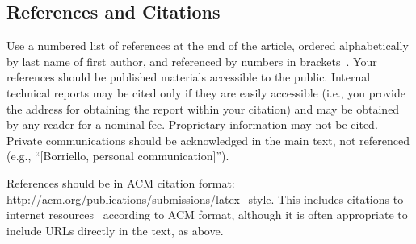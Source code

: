 \documentclass{sigchi}
\begin{document}
\subsection{References and Citations}

Use a numbered list of references at the end of the article, ordered
alphabetically by last name of first author, and referenced by numbers
in
brackets~\cite{acm_categories,ethics,Klemmer:2002:WSC:503376.503378}.
Your references should be published materials accessible to the
public. Internal technical reports may be cited only if they are
easily accessible (i.e., you provide the address for obtaining the
report within your citation) and may be obtained by any reader for a
nominal fee. Proprietary information may not be cited. Private
communications should be acknowledged in the main text, not referenced
(e.g., ``[Borriello, personal communication]'').

References should be in ACM citation format:
\url{http://acm.org/publications/submissions/latex_style}. This
includes citations to internet
resources~\cite{acm_categories,cavender:writing,CHINOSAUR:venue,psy:gangnam}
according to ACM format, although it is often appropriate to include
URLs directly in the text, as above.



\end{document}
